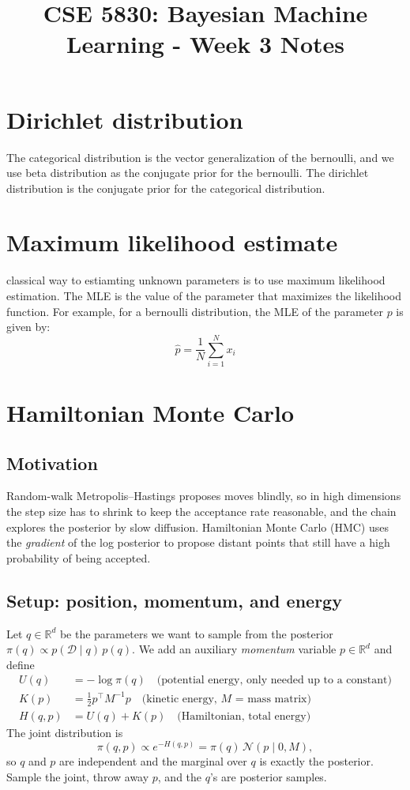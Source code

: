 \documentclass[11pt]{article}
\title{CSE 5830: Bayesian Machine Learning - Week 3 Notes}
\author{}
\date{}
\begin{document}
\maketitle
\section*{Dirichlet distribution}
The categorical distribution is the vector generalization of the bernoulli, and we use beta distribution as the conjugate prior for the bernoulli. The dirichlet distribution is the conjugate prior for the categorical distribution.
\section{Maximum likelihood estimate}
classical way to estiamting unknown parameters is to use maximum likelihood estimation. The MLE is the value of the parameter that maximizes the likelihood function. For example, for a bernoulli distribution, the MLE of the parameter $p$ is given by:
\begin{equation}
    \hat{p} = \frac{1}{N} \sum_{i=1}^{N} x_i
\end{equation}

\section{Hamiltonian Monte Carlo}
\subsection{Motivation}
Random-walk Metropolis--Hastings proposes moves blindly, so in high dimensions the step size has to shrink to keep the acceptance rate reasonable, and the chain explores the posterior by slow diffusion. Hamiltonian Monte Carlo (HMC) uses the \emph{gradient} of the log posterior to propose distant points that still have a high probability of being accepted.

\subsection{Setup: position, momentum, and energy}
Let $q \in \mathbb{R}^d$ be the parameters we want to sample from the posterior $\pi(q) \propto p(\mathcal{D} \mid q)\, p(q)$. We add an auxiliary \emph{momentum} variable $p \in \mathbb{R}^d$ and define
\begin{align}
    U(q) &= -\log \pi(q) \quad \text{(potential energy, only needed up to a constant)} \\
    K(p) &= \tfrac{1}{2} p^\top M^{-1} p \quad \text{(kinetic energy, $M$ = mass matrix)} \\
    H(q, p) &= U(q) + K(p) \quad \text{(Hamiltonian, total energy)}
\end{align}
The joint distribution is
\begin{equation}
    \pi(q, p) \propto e^{-H(q,p)} = \pi(q)\, \mathcal{N}(p \mid 0, M),
\end{equation}
so $q$ and $p$ are independent and the marginal over $q$ is exactly the posterior. Sample the joint, throw away $p$, and the $q$'s are posterior samples.
\end{document}
